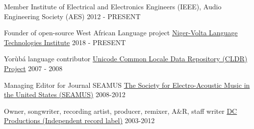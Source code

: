 

\begin{cventries}
	
  \cventry
    {Member} %
    {Institute of Electrical and Electronics Engineers (IEEE), Audio Engineering Society (AES)} %
    {} %
    {2012 - PRESENT} %
    {}

  \cventry
    {Founder of open-source West African Language project} %
    {\href{https://github.com/Niger-Volta-LTI}{Niger-Volta Language Technologies Institute}} %
    {} %
    {2018 - PRESENT} %
    {}

  \cventry
    {Yor{\`u}b{\'a} language contributor} %
    {\href{http://cldr.unicode.org}{Unicode Common Locale Data Repository (CLDR) Project}} %
    {} %
    {2007 - 2008} %
    {}

  \cventry
    {Managing Editor for Journal SEAMUS} %
    {\href{https://www.seamusonline.org}{The Society for Electro-Acoustic Music in the United States (SEAMUS)}} %
    {} %
    {2008-2012} %
    {}
    
  \cventry
    {Owner, songwriter, recording artist, producer, remixer, A\&R, staff writer} %
    {\href{http://www.discogs.com/label/43535-Defchild-Productions}{DC Productions (Independent record label)}} %
    {} %
    {2003-2012} %
    {}
	
\end{cventries}

